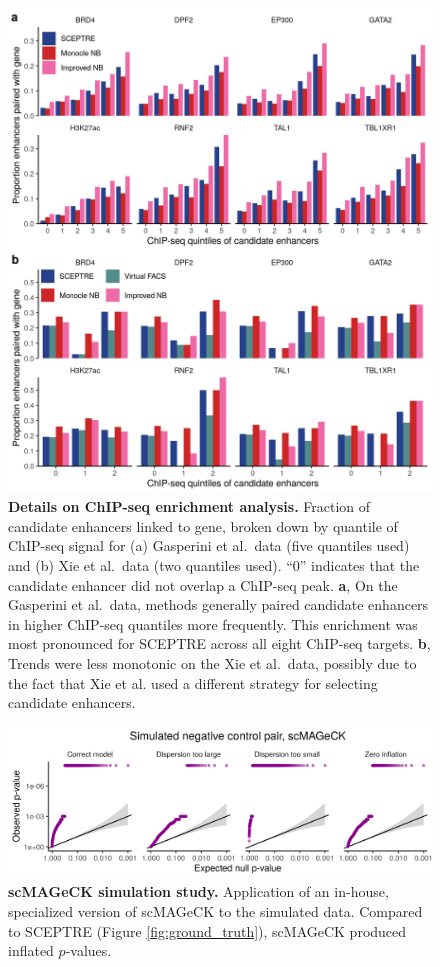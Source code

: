 \documentclass{article}
\begin{document}
 \clearpage
 \thispagestyle{empty}
\begin{figure}
	\includegraphics[width =\textwidth]{FigureS5.png}
	\caption{\textbf{Details on ChIP-seq enrichment analysis.} Fraction of candidate enhancers linked to gene, broken down by quantile of ChIP-seq signal for (a) Gasperini et al.\ data (five quantiles used) and (b) Xie et al.\ data (two quantiles used). ``0'' indicates that the candidate enhancer did not overlap a ChIP-seq peak. \textbf{a}, On the Gasperini et al.\ data, methods generally paired candidate enhancers in higher ChIP-seq quantiles more frequently. This enrichment was most pronounced for SCEPTRE across all eight ChIP-seq targets. \textbf{b}, Trends were less monotonic on the Xie et al.\ data, possibly due to the fact that Xie et al. used a different strategy for selecting candidate enhancers.\cite{Xie2019}
 	}
	\label{fig:chipseq-enrichment-details}
 \end{figure}
 
  \clearpage
 \thispagestyle{empty} 
\begin{figure}
	\includegraphics[width = \textwidth]{FigureS6.png}
	\caption{\textbf{scMAGeCK simulation study.} Application of an in-house, specialized version of scMAGeCK to the simulated data. Compared to SCEPTRE (Figure \ref{fig:ground_truth}), scMAGeCK produced inflated $p$-values.}
	\label{fig:scmageck}
 \end{figure}
\end{document}
